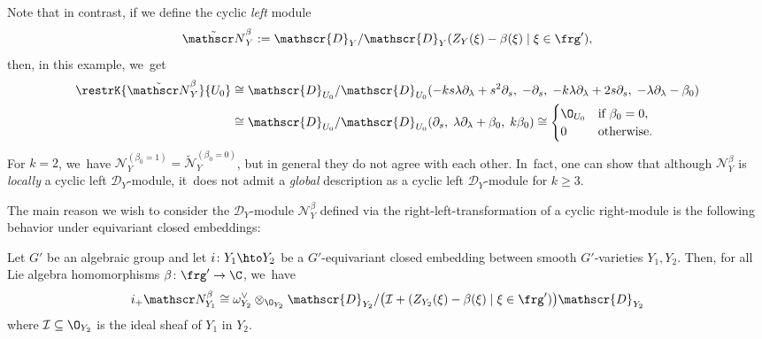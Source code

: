 \begin{exa}
Note that in contrast, if we define the cyclic \emph{left} module
\[
\tilde{\mathscr N}_Y^\beta := \mathscr{D}_Y/\mathscr{D}_Y(Z_Y(\xi)-\beta(\xi) \mid \xi \in \frg'),
\]
then, in this example, we~get
\begin{align*}
\restrK{\tilde{\mathscr N}_Y^\beta}{U_0} &\cong
\mathscr{D}_{U_0}/\mathscr{D}_{U_0}(
-ks \lambda \partial_\lambda + s^2 \partial_s, \;
-\partial_s, \;
-k \lambda \partial_\lambda + 2 s \partial_s, \;
-\lambda \partial_\lambda - \beta_0) \\
&\cong \mathscr{D}_{U_0}/\mathscr{D}_{U_0}(
\partial_s, \;
\lambda \partial_\lambda + \beta_0, \;
k \beta_0)
\cong
\begin{cases}
\O_{U_0} &\text{if } \beta_0 = 0, \\
0 &\text{otherwise}.
\end{cases}
\end{align*}
For $k = 2$, we~have $\mathscr N_Y^{(\beta_0=1)} = \tilde{\mathscr N}_Y^{(\beta_0=0)}$, but in general they do not agree with each other. In~fact, one can show that although $\mathscr{N}_Y^\beta$ is \emph{locally} a cyclic left $\mathscr D_Y$\nobreakdash-mod\-ule, it~does not admit a \emph{global} description as a cyclic left $\mathscr D_Y$\nobreakdash-mod\-ule for $k \geq 3$.
\end{exa}

The main reason we wish to consider the $\mathscr D_Y$\nobreakdash-mod\-ule $\mathscr N_Y^\beta$ defined via the right-left-transformation of a cyclic right\nobreakdash-mod\-ule is the following behavior under equivariant closed embeddings:

\begin{prop} \label{prop:directImageOfNbeta}
Let $G'$ be an algebraic group and let $i \colon Y_1 \hto Y_2$ be a $G'$\nobreakdash-equi\-variant closed embedding between smooth $G'$-varieties $Y_1,Y_2$.
Then, for all Lie algebra homomorphisms $\beta \colon \frg' \to \C$, we~have
\[
i_+ \mathscr N_{Y_1}^\beta \cong \omega_{Y_2}^\vee \otimes_{\O_{Y_2}} \mathscr{D}_{Y_2}/\big(\mathcal{I} + (Z_{Y_2}(\xi)-\beta(\xi) \mid \xi \in \frg')\big)\mathscr{D}_{Y_2}
\]
where $\mathcal {I} \subseteq \O_{Y_2}$ is the ideal sheaf of $Y_1$ in $Y_2$.
\end{prop}

